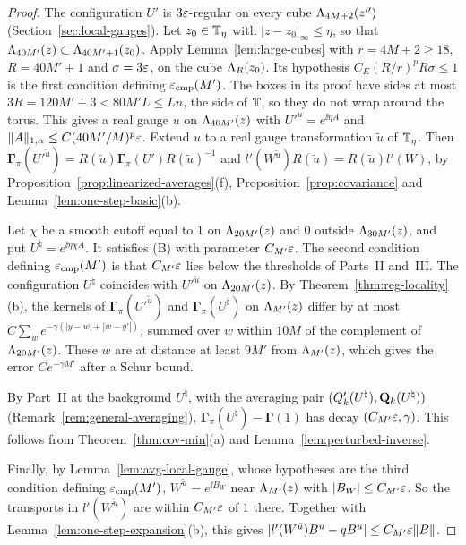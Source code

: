 \begin{proof}
The configuration $U'$ is $3\varepsilon$-regular on every cube $\Lambda_{4M+2}(z'')$ (Section~\ref{sec:local-gauges}). Let $z_0\in\mathbb T_\eta$ with $|z-z_0|_\infty\le\eta$, so that $\Lambda_{40M'}(z)\subset\Lambda_{40M'+1}(z_0)$. Apply Lemma~\ref{lem:large-cubes} with $r=4M+2\ge18$, $R=40M'+1$ and $\sigma=3\varepsilon$, on the cube $\Lambda_R(z_0)$. Its hypothesis $C_E(R/r)^pR\sigma\le1$ is the first condition defining $\varepsilon_{\rm cmp}(M')$. The boxes in its proof have sides at most $3R=120M'+3<80M'L\le Ln$, the side of $\mathbb T$, so they do not wrap around the torus. This gives a real gauge $u$ on $\Lambda_{40M'}(z)$ with $U'^u=e^{\ii\eta A}$ and $\|A\|_{1,\alpha}\le C(40M'/M)^p\varepsilon$. Extend $u$ to a real gauge transformation $\tilde u$ of $\mathbb T_\eta$. Then $\boldsymbol\Gamma_\pi(U'^{\tilde u})=R(\tilde u)\boldsymbol\Gamma_\pi(U')R(\tilde u)^{-1}$ and $l'(W^{\tilde u})R(\tilde u)=R(\tilde u)l'(W)$, by Proposition~\ref{prop:linearized-averages}(f), Proposition~\ref{prop:covariance} and Lemma~\ref{lem:one-step-basic}(b).

Let $\chi$ be a smooth cutoff equal to $1$ on $\Lambda_{20M'}(z)$ and $0$ outside $\Lambda_{30M'}(z)$, and put $U^\natural=e^{\ii\eta\chi A}$. It satisfies (B) with parameter $C_{M'}\varepsilon$. The second condition defining $\varepsilon_{\rm cmp}(M')$ is that $C_{M'}\varepsilon$ lies below the thresholds of Parts~II and~III. The configuration $U^\natural$ coincides with $U'^{\tilde u}$ on $\Lambda_{20M'}(z)$. By Theorem~\ref{thm:reg-locality}(b), the kernels of $\boldsymbol\Gamma_\pi(U'^{\tilde u})$ and $\boldsymbol\Gamma_\pi(U^\natural)$ on $\Lambda_{M'}(z)$ differ by at most $C\sum_{w}e^{-\gamma(|y-w|+|w-y'|)}$, summed over $w$ within $10M$ of the complement of $\Lambda_{20M'}(z)$. These $w$ are at distance at least $9M'$ from $\Lambda_{M'}(z)$, which gives the error $Ce^{-\gamma M'}$ after a Schur bound.

By Part~II at the background $U^\natural$, with the averaging pair $(Q'_k(U^\natural),\mathbf Q_k(U^\natural))$ (Remark~\ref{rem:general-averaging}), $\boldsymbol\Gamma_\pi(U^\natural)-\boldsymbol\Gamma(1)$ has decay $(C_{M'}\varepsilon,\gamma)$. This follows from Theorem~\ref{thm:cov-min}(a) and Lemma~\ref{lem:perturbed-inverse}.

Finally, by Lemma~\ref{lem:avg-local-gauge}, whose hypotheses are the third condition defining $\varepsilon_{\rm cmp}(M')$, $W^{\tilde u}=e^{\ii B_W}$ near $\Lambda_{M'}(z)$ with $|B_W|\le C_{M'}\varepsilon$. So the transports in $l'(W^{\tilde u})$ are within $C_{M'}\varepsilon$ of $1$ there. Together with Lemma~\ref{lem:one-step-expansion}(b), this gives $|l'(W^{\tilde u})B^u-qB^u|\le C_{M'}\varepsilon\|B\|$.
\end{proof}


